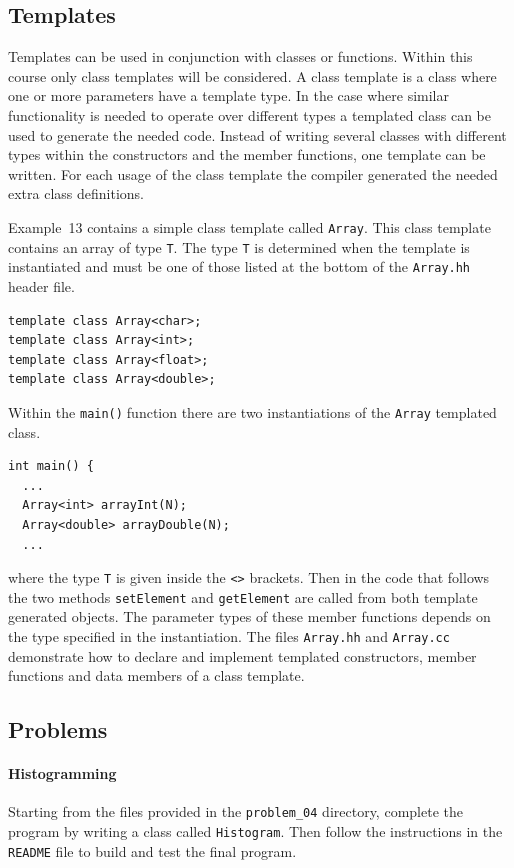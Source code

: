 \documentclass[11pt,a4paper]{scrartcl}
\def\main{\texttt{main()}$\;$}
\begin{document}

\subsection{Templates}
Templates can be used in conjunction with classes or functions.  Within
this course only class templates will be considered.  A
class template is a class where one or more parameters have a template
type.  In the case where similar functionality is needed to operate
over different types a templated class can be used to generate the
needed code.  Instead of writing several classes with different types within
the constructors and the member functions, one template can be
written.  For each usage of the class template the compiler generated
the needed extra class definitions.

Example~13 contains a simple class template called \texttt{Array}.
This class template contains an array of type \texttt{T}.  The type
\texttt{T} is determined when the template is instantiated and must be
one of those listed at the bottom of the
\texttt{Array.hh} header file.
\begin{verbatim}
template class Array<char>;
template class Array<int>;
template class Array<float>;
template class Array<double>;
\end{verbatim}
Within the \main function there are two instantiations of the
\texttt{Array} templated class.
\begin{verbatim}
int main() {
  ...
  Array<int> arrayInt(N);
  Array<double> arrayDouble(N);
  ...
\end{verbatim}
where the type \texttt{T} is given inside the \texttt{<>}
brackets.  Then in the code that follows the two methods
\texttt{setElement} and \texttt{getElement} are called from both
template generated objects.  The parameter types of these member
functions depends on the type specified in the instantiation.  The
files \texttt{Array.hh} and \texttt{Array.cc} demonstrate how to
declare and implement templated constructors, member functions and
data members of a class template.


\subsection{Problems}

\paragraph{Histogramming}
Starting from the files provided in the \texttt{problem\_04} directory,
complete the program by writing a class called \texttt{Histogram}.
Then follow the instructions in the \texttt{README} file to build and
test the final program.
\end{document}
